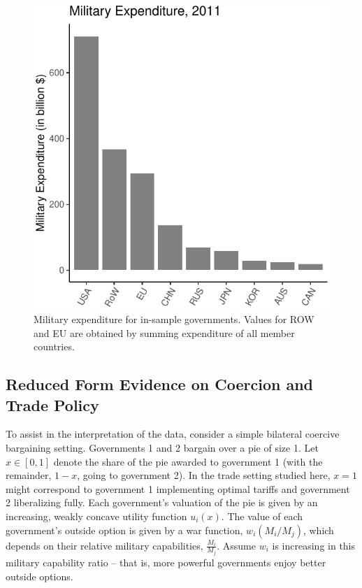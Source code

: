 \documentclass{puthesis}
\begin{document}
\begin{figure}
\centering
\includegraphics{figure/milex-1.pdf}
\caption{Military expenditure for in-sample governments. Values for ROW
and EU are obtained by summing expenditure of all member countries.
\label{fig:milex}}
\end{figure}

\subsection{Reduced Form Evidence on Coercion and Trade Policy}

To assist in the interpretation of the data, consider a simple bilateral
coercive bargaining setting. Governments 1 and 2 bargain over a pie of
size 1. Let \(x \in [0, 1]\) denote the share of the pie awarded to
government 1 (with the remainder, \(1-x\), going to government 2). In
the trade setting studied here, \(x=1\) might correspond to government 1
implementing optimal tariffs and government 2 liberalizing fully. Each
government's valuation of the pie is given by an increasing, weakly
concave utility function \(u_i(x)\). The value of each government's
outside option is given by a war function, \(w_i(M_i / M_j)\), which
depends on their relative military capabilities, \(\frac{M_i}{M_j}\).
Assume \(w_i\) is increasing in this military capability ratio -- that
is, more powerful governments enjoy better outside options.
\end{document}
